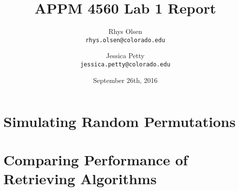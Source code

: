 \documentclass{article}
\title{APPM 4560 Lab 1 Report}
\author{
  Rhys Olsen\\
  \texttt{rhys.olsen@colorado.edu}
  \and
  Jessica Petty\\
  \texttt{jessica.petty@colorado.edu}
}
\date{September 26th, 2016}
\begin{document}
\maketitle
\section{Simulating Random Permutations}
\section{Comparing Performance of Retrieving Algorithms}
\end{document}
